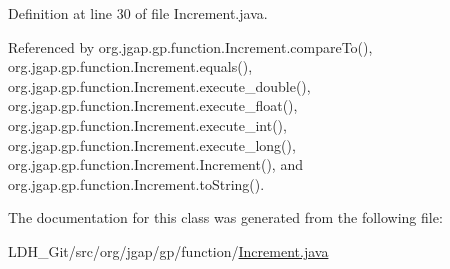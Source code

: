 Definition at line 30 of file Increment.\-java.



Referenced by org.\-jgap.\-gp.\-function.\-Increment.\-compare\-To(), org.\-jgap.\-gp.\-function.\-Increment.\-equals(), org.\-jgap.\-gp.\-function.\-Increment.\-execute\-\_\-double(), org.\-jgap.\-gp.\-function.\-Increment.\-execute\-\_\-float(), org.\-jgap.\-gp.\-function.\-Increment.\-execute\-\_\-int(), org.\-jgap.\-gp.\-function.\-Increment.\-execute\-\_\-long(), org.\-jgap.\-gp.\-function.\-Increment.\-Increment(), and org.\-jgap.\-gp.\-function.\-Increment.\-to\-String().



The documentation for this class was generated from the following file\-:\begin{DoxyCompactItemize}
\item 
L\-D\-H\-\_\-\-Git/src/org/jgap/gp/function/\hyperlink{_increment_8java}{Increment.\-java}\end{DoxyCompactItemize}
